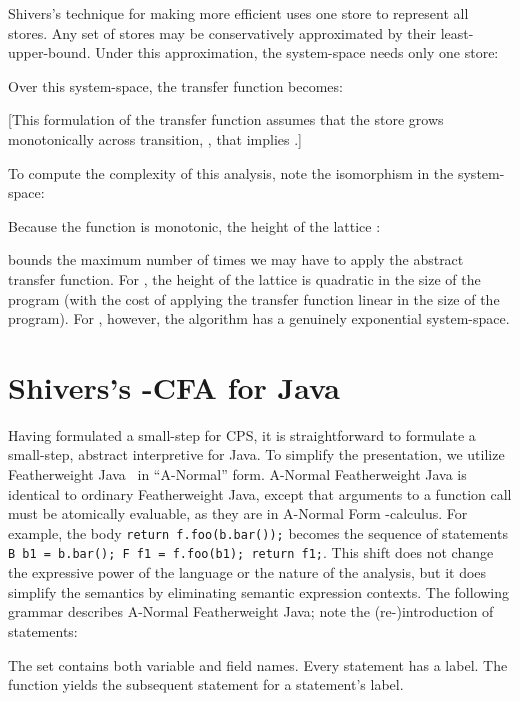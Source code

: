 Shivers's technique for making \kCFA{} more efficient uses one
store to represent all stores.
Any set of stores may be conservatively approximated by 
their least-upper-bound.
Under this approximation, the system-space needs only one
store:
\begin{small}\end{small}Over this system-space, the transfer function becomes:
\begin{small}\end{small}[This formulation of the transfer function assumes
that the store grows monotonically across transition, \ie, that
 implies .]


To compute the complexity of this analysis, note the isomorphism in the system-space:
\begin{small}\end{small}Because the function  is monotonic, 
the height of the lattice :
\begin{small}\end{small}bounds the maximum number of times we may have to apply the
abstract transfer function. 
For , the height of the lattice is quadratic in the size of the
program (with the cost of applying the transfer function linear
in the size of the program).
For , however, the algorithm has a genuinely exponential
system-space.






\section{Shivers's -CFA{} for Java}
\label{sec:kcfa-java}


Having formulated a small-step \kCFA{} for CPS, it is straightforward
to formulate a small-step, abstract interpretive \kCFA{} for Java.
To simplify the presentation, we utilize Featherweight
Java~\cite{dvanhorn:Igarashi:TOPLAS:2001} in ``A-Normal'' form.
A-Normal Featherweight Java is identical to ordinary Featherweight
Java, except that arguments to a function call must be atomically
evaluable, as they are in A-Normal Form -calculus.
For example, the body {\tt return f.foo(b.bar());} becomes the sequence of statements {\tt B b1
  = b.bar(); F f1 = f.foo(b1); return f1;}.
This shift does not change the expressive power of the language or the
nature of the analysis, but it does simplify the semantics by
eliminating semantic expression contexts.
The following grammar describes A-Normal Featherweight Java; note the
(re-)introduction of statements:
\begin{small}\end{small}\begin{small}\end{small}The set  contains both variable and field names.
Every statement has a label.
The function  yields the
subsequent statement for a statement's label.




